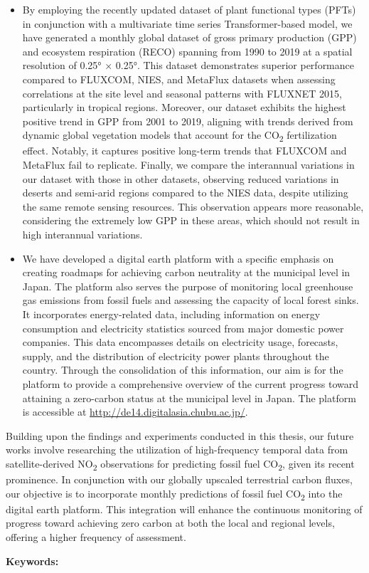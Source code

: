 \begin{itemize}
    \item By employing the recently updated dataset of plant functional types (PFTs) in conjunction with a multivariate time series Transformer-based model, we have generated a monthly global dataset of gross primary production (GPP) and ecosystem respiration (RECO) spanning from 1990 to 2019 at a spatial resolution of 0.25° × 0.25°. This dataset demonstrates superior performance compared to FLUXCOM, NIES, and MetaFlux datasets when assessing correlations at the site level and seasonal patterns with FLUXNET 2015, particularly in tropical regions. Moreover, our dataset exhibits the highest positive trend in GPP from 2001 to 2019, aligning with trends derived from dynamic global vegetation models that account for the CO\textsubscript{2} fertilization effect. Notably, it captures positive long-term trends that FLUXCOM and MetaFlux fail to replicate. Finally, we compare the interannual variations in our dataset with those in other datasets, observing reduced variations in deserts and semi-arid regions compared to the NIES data, despite utilizing the same remote sensing resources. This observation appears more reasonable, considering the extremely low GPP in these areas, which should not result in high interannual variations.
    \item We have developed a digital earth platform with a specific emphasis on creating roadmaps for achieving carbon neutrality at the municipal level in Japan. The platform also serves the purpose of monitoring local greenhouse gas emissions from fossil fuels and assessing the capacity of local forest sinks. It incorporates energy-related data, including information on energy consumption and electricity statistics sourced from major domestic power companies. This data encompasses details on electricity usage, forecasts, supply, and the distribution of electricity power plants throughout the country. Through the consolidation of this information, our aim is for the platform to provide a comprehensive overview of the current progress toward attaining a zero-carbon status at the municipal level in Japan. The platform is accessible at \url{http://de14.digitalasia.chubu.ac.jp/}.
\end{itemize}

Building upon the findings and experiments conducted in this thesis, our future works involve researching the utilization of high-frequency temporal data from satellite-derived NO\textsubscript{2} observations for predicting fossil fuel CO\textsubscript{2}, given its recent prominence. In conjunction with our globally upscaled terrestrial carbon fluxes, our objective is to incorporate monthly predictions of fossil fuel CO\textsubscript{2} into the digital earth platform. This integration will enhance the continuous monitoring of progress toward achieving zero carbon at both the local and regional levels, offering a higher frequency of assessment. \par

\vspace*{5truemm}
\begin{flushleft}
 {\bfseries Keywords:}
\end{flushleft}\ekeywords
